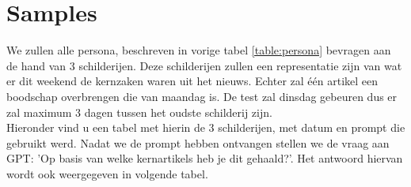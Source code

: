 \section{Samples}
We zullen alle persona, beschreven in vorige tabel  \ref{table:persona} bevragen aan de hand van 3 schilderijen. Deze schilderijen zullen een representatie zijn van wat er dit weekend de kernzaken waren uit het nieuws. Echter zal één artikel een boodschap overbrengen die van maandag is. De test zal dinsdag gebeuren dus er zal maximum 3 dagen tussen het oudste schilderij zijn.  \\
Hieronder vind u een tabel met hierin de 3 schilderijen, met datum en prompt die gebruikt werd. 
Nadat we de prompt hebben ontvangen stellen we de vraag aan GPT: 'Op basis van welke kernartikels heb je dit gehaald?'. Het antwoord hiervan wordt ook weergegeven in volgende tabel.
